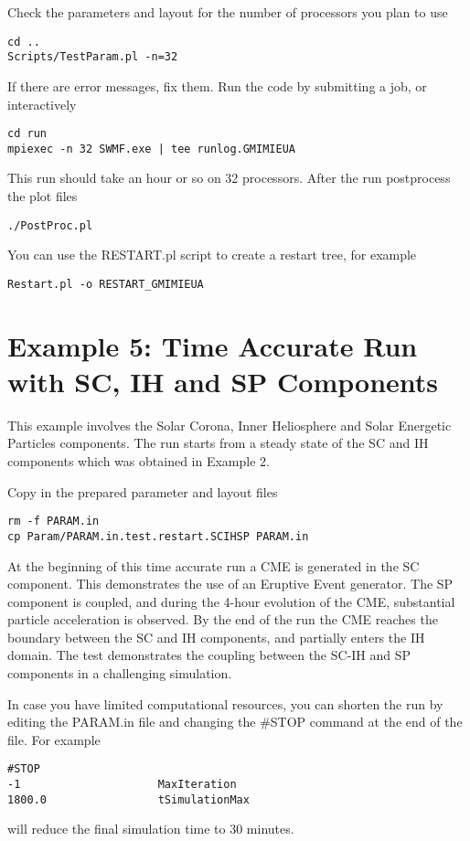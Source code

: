 Check the parameters and layout for the number of processors you plan to use
\begin{verbatim}
cd ..
Scripts/TestParam.pl -n=32
\end{verbatim}
If there are error messages, fix them. 
Run the code by submitting a job, or interactively
\begin{verbatim}
cd run
mpiexec -n 32 SWMF.exe | tee runlog.GMIMIEUA
\end{verbatim}
This run should take an hour or so on 32 processors.
After the run postprocess the plot files
\begin{verbatim}
./PostProc.pl
\end{verbatim}
You can use the RESTART.pl script to create a restart tree, for example
\begin{verbatim}
Restart.pl -o RESTART_GMIMIEUA
\end{verbatim}

\section{Example 5: Time Accurate Run with SC, IH and SP Components}

This example involves the Solar Corona, Inner Heliosphere
and Solar Energetic Particles components.
The run starts from a steady state of the SC and IH components
which was obtained in Example 2.

Copy in the prepared parameter and layout files
\begin{verbatim}
rm -f PARAM.in
cp Param/PARAM.in.test.restart.SCIHSP PARAM.in
\end{verbatim}
At the beginning of this time accurate run a CME is 
generated in the SC component. This demonstrates the
use of an Eruptive Event generator.
The SP component is coupled, and during the 4-hour evolution
of the CME, substantial particle acceleration is observed. 
By the end of the run the CME reaches the boundary 
between the SC and IH components, and partially enters the IH domain.
The test demonstrates the coupling between the SC-IH and SP
components in a challenging simulation.

In case you have limited computational resources, you can 
shorten the run by editing the PARAM.in file and changing
the \#STOP command at the end of the file. For example 
\begin{verbatim}
#STOP
-1                     MaxIteration
1800.0                 tSimulationMax
\end{verbatim}
will reduce the final simulation time to 30 minutes.

